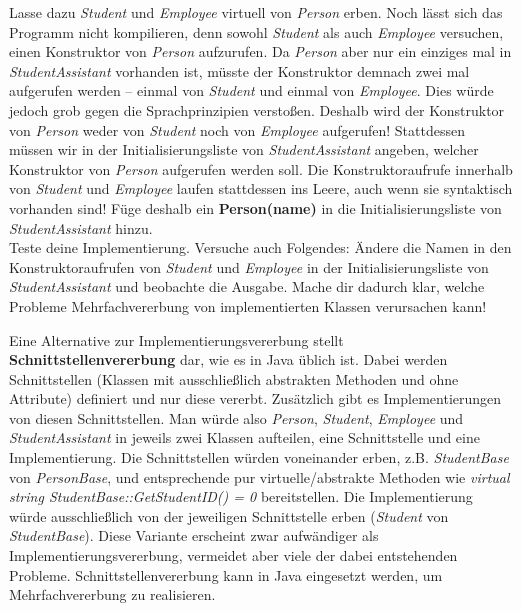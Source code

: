 \begin{enumerate}
Lasse dazu \emph{Student} und \emph{Employee} virtuell von \emph{Person} erben.
Noch lässt sich das Programm nicht kompilieren, denn sowohl \emph{Student} als auch \emph{Employee} versuchen, einen Konstruktor von \emph{Person} aufzurufen.
Da \emph{Person} aber nur ein einziges mal in \emph{StudentAssistant} vorhanden ist, müsste der Konstruktor demnach zwei mal aufgerufen werden -- einmal von \emph{Student} und einmal von \emph{Employee}.
Dies würde jedoch grob gegen die Sprachprinzipien verstoßen.
Deshalb wird der Konstruktor von \emph{Person} weder von \emph{Student} noch von \emph{Employee} aufgerufen!
Stattdessen müssen wir in der Initialisierungsliste von \emph{StudentAssistant} angeben, welcher Konstruktor von \emph{Person} aufgerufen werden soll.
Die Konstruktoraufrufe innerhalb von \emph{Student} und \emph{Employee} laufen stattdessen ins Leere, auch wenn sie syntaktisch vorhanden sind! Füge deshalb ein \textbf{Person(name)} in die Initialisierungsliste von \emph{StudentAssistant} hinzu.\\

Teste deine Implementierung.
Versuche auch Folgendes: Ändere die Namen in den Konstruktoraufrufen von \emph{Student} und \emph{Employee} in der Initialisierungsliste von \emph{StudentAssistant} und beobachte die Ausgabe. 
Mache dir dadurch klar, welche Probleme Mehrfachvererbung von implementierten Klassen verursachen kann!\\

\end{enumerate}

Eine Alternative zur Implementierungsvererbung stellt \textbf{Schnittstellenvererbung} dar, wie es in Java üblich ist. Dabei werden Schnittstellen (Klassen mit ausschließlich abstrakten Methoden und ohne Attribute) definiert und nur diese vererbt.
Zusätzlich gibt es Implementierungen von diesen Schnittstellen.
Man würde also \emph{Person}, \emph{Student}, \emph{Employee} und \emph{StudentAssistant} in jeweils zwei Klassen aufteilen, eine Schnittstelle und eine Implementierung.
Die Schnittstellen würden voneinander erben, z.B. \emph{StudentBase} von \emph{PersonBase}, und entsprechende pur virtuelle/abstrakte Methoden wie \emph{virtual string StudentBase::GetStudentID() = 0} bereitstellen.
Die Implementierung würde ausschließlich von der jeweiligen Schnittstelle erben (\emph{Student} von \emph{StudentBase}).
Diese Variante erscheint zwar aufwändiger als Implementierungsvererbung, vermeidet aber viele der dabei entstehenden Probleme. 
Schnittstellenvererbung kann in Java eingesetzt werden, um Mehrfachvererbung zu realisieren.


